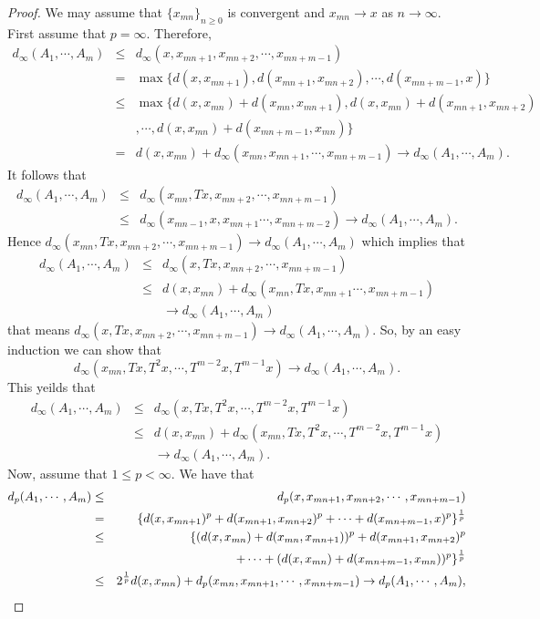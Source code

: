 \documentclass{amsart}
\theoremstyle{definition}
\theoremstyle{remark}
\begin{document}
\begin{proof}
We may assume that  $\{x_{mn}\}_{n\geq0}$ is convergent and $x_{mn}\to x$ as $n\to\infty$. First assume that $p=\infty$. Therefore,
\begin{eqnarray*}
d_\infty(A_1,\cdots,A_m)&\leq& d_\infty(x,x_{mn+1},x_{mn+2},\cdots,x_{mn+m-1})\\
&=&\max\{d(x,x_{mn+1}),d(x_{mn+1},x_{mn+2}),\cdots,d(x_{mn+m-1},x)\}\\
&\leq&\max\{d(x,x_{mn})+d(x_{mn},x_{mn+1}),d(x,x_{mn})+d(x_{mn+1},x_{mn+2})\\&&,\cdots,d(x,x_{mn})+d(x_{mn+m-1},x_{mn})\}\\&=&d(x,x_{mn})+d_\infty(x_{mn},x_{mn+1},\cdots,x_{mn+m-1})\to d_\infty(A_1,\cdots,A_m).
\end{eqnarray*}
It follows that
\begin{eqnarray*}
d_\infty(A_1,\cdots,A_m)&\leq& d_\infty(x_{mn},Tx,x_{mn+2},\cdots,x_{mn+m-1})\\
&\leq&d_\infty(x_{mn-1},x,x_{mn+1}\cdots,x_{mn+m-2})\to d_\infty(A_1,\cdots,A_m).
\end{eqnarray*}
Hence $d_\infty(x_{mn},Tx,x_{mn+2},\cdots,x_{mn+m-1})\to d_\infty(A_1,\cdots,A_m)$ which implies that
\begin{eqnarray*}
d_\infty(A_1,\cdots,A_m)&\leq& d_\infty(x,Tx,x_{mn+2},\cdots,x_{mn+m-1})\\
&\leq&d(x,x_{mn})+d_\infty(x_{mn},Tx,x_{mn+1}\cdots,x_{mn+m-1})\\&&\to d_\infty(A_1,\cdots,A_m)
\end{eqnarray*}
that means $d_\infty(x,Tx,x_{mn+2},\cdots,x_{mn+m-1})\to d_\infty(A_1,\cdots,A_m)$. So, by an easy induction we can show that
$$d_\infty(x_{mn},Tx,T^2x,\cdots,T^{m-2}x,T^{m-1}x)\to d_\infty(A_1,\cdots,A_m).$$
This yeilds that
\begin{eqnarray*}
d_\infty(A_1,\cdots,A_m)&\leq&d_\infty(x,Tx,T^2x,\cdots,T^{m-2}x,T^{m-1}x)\\
&\leq&d(x,x_{mn})+d_\infty(x_{mn},Tx,T^2x,\cdots,T^{m-2}x,T^{m-1}x)\\&&\to d_\infty(A_1,\cdots,A_m).
\end{eqnarray*}
Now, assume that $1\leq p<\infty$. We have that
\begin{eqnarray*}
d_p(A_1,\cdots,A_m)&\leq& d_p(x,x_{mn+1},x_{mn+2},\cdots,x_{mn+m-1})\\
&=&\{d(x,x_{mn+1})^p+d(x_{mn+1},x_{mn+2})^p+\cdots+d(x_{mn+m-1},x)^p\}^{1\over p}\\
&\leq&\{(d(x,x_{mn})+d(x_{mn},x_{mn+1}))^p+d(x_{mn+1},x_{mn+2})^p\\&&+\cdots+(d(x,x_{mn})+d(x_{mn+m-1},x_{mn}))^p\}^{1\over p}\\&\leq&2^{1\over p}d(x,x_{mn})+d_p(x_{mn},x_{mn+1},\cdots,x_{mn+m-1})\to d_p(A_1,\cdots,A_m),

\end{eqnarray*}
\end{proof}
\end{document}
